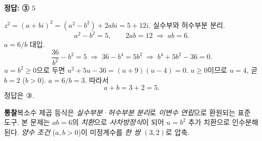 \documentclass[10pt]{article}
\newcommand{\solnote}[1]{\par\smallskip\noindent
  \begin{tcolorbox}[enhanced, breakable, colback=vB-light, colframe=vB-light,
    boxrule=0pt, arc=3pt, left=10pt, right=10pt, top=4pt, bottom=4pt,
    fontupper=\sffamily\footnotesize\color{vB-ink}]
    \textbf{\color{vB-deep}통찰}\quad #1
  \end{tcolorbox}}
\begin{document}
\begin{answerbox}\sffamily\bfseries 정답: ③ $5$\end{answerbox}
 $z^2 = (a + bi)^2 = (a^2 - b^2) + 2abi = 5 + 12i$. 실수부와 허수부분 분리.
\[ a^2 - b^2 = 5, \qquad 2ab = 12 \;\Longrightarrow\; ab = 6. \]
 $a = 6/b$ 대입.
\[ \frac{36}{b^2} - b^2 = 5 \;\Longrightarrow\; 36 - b^4 = 5b^2 \;\Longrightarrow\; b^4 + 5b^2 - 36 = 0. \]
 $u = b^2 \ge 0$으로 두면 $u^2 + 5u - 36 = (u + 9)(u - 4) = 0$. $u \ge 0$이므로 $u = 4$, 곧 $b = 2$ ($b > 0$).
 $a = 6/b = 3$. 따라서
\[ a + b = 3 + 2 = 5. \]
정답은 $\textbf{③}$.
\solnote{복소수 제곱 등식은 \emph{실수부분·허수부분 분리}로 \emph{이변수 연립}으로 환원되는 표준 도구. 본 문제는 $ab = 6$의 \emph{치환}으로 \emph{사차방정식}이 되어 $u = b^2$ 추가 치환으로 인수분해된다. \emph{양수 조건} ($a, b > 0$)이 미정계수를 \emph{한 쌍 $(3, 2)$}로 압축.}

\end{document}
